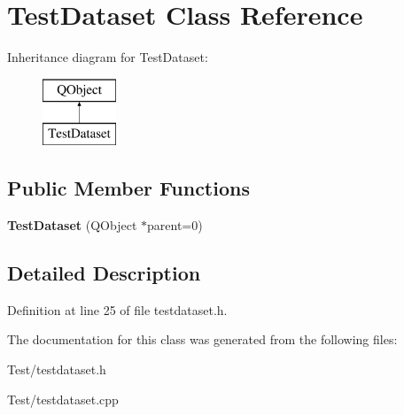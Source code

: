\hypertarget{class_test_dataset}{}\section{Test\+Dataset Class Reference}
\label{class_test_dataset}
Inheritance diagram for Test\+Dataset\+:\begin{figure}[H]
\begin{center}
\leavevmode
\includegraphics[height=2.000000cm]{class_test_dataset}
\end{center}
\end{figure}
\subsection*{Public Member Functions}
\begin{DoxyCompactItemize}
\item 
{\bfseries Test\+Dataset} (Q\+Object $\ast$parent=0)\hypertarget{class_test_dataset_a38c234d9daed404fd05a6c9d94e03fe1}{}\label{class_test_dataset_a38c234d9daed404fd05a6c9d94e03fe1}

\end{DoxyCompactItemize}


\subsection{Detailed Description}


Definition at line 25 of file testdataset.\+h.



The documentation for this class was generated from the following files\+:\begin{DoxyCompactItemize}
\item 
Test/testdataset.\+h\item 
Test/testdataset.\+cpp\end{DoxyCompactItemize}
